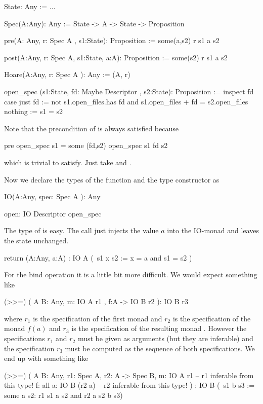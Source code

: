 \begin{alba}
  State: Any := ...

  Spec(A:Any): Any :=  State -> A -> State -> Proposition

  pre(A: Any, r: Spec A , s1:State): Proposition :=
    some(a,s2) r s1 a s2

  post(A:Any, r: Spec A, s1:State, a:A): Proposition :=
    some(s2) r s1 a s2


  Hoare(A:Any, r: Spec A ): Any := (A, r)

  open_spec (s1:State, fd: Maybe Descriptor , s2:State): Proposition :=
    inspect fd case
      just fd  :=
        not s1.open_files.has fd
        and
        s1.open_files + fd = s2.open_files
      nothing :=
        s1 = s2
\end{alba}
Note that the precondition of  is always satisfied because
%
\begin{alba}
   pre open_spec s1  = some (fd,s2) open_spec s1 fd s2
\end{alba}
%
which is trivial to satisfy. Just take  and .

Now we declare the types of the function  and the type constructor
 as
%
\begin{alba}
  IO(A:Any, spec: Spec A ): Any

  open: IO Descriptor open_spec
\end{alba}
%
The type of  is easy. The call  just injects the
value $a$ into the IO-monad and leaves the state unchanged.
%
\begin{alba}
  return (A:Any, a:A)
         : IO  A
               (\ s1 x s2 :=
                   x  = a and
                   s1 = s2 )
\end{alba}
%
For the bind operation it is a little bit more difficult. We would expect
something like
%
\begin{alba}
  (>>=) ( A B: Any,
          m: IO A r1 ,
          f:A -> IO B r2
        ): IO B r3
\end{alba}
%
where $r_1$ is the specification of the first monad and $r_2$ is the
specification of the monad $f(a)$ and $r_3$ is the specification of the
resulting monad . However the specifications $r_1$ and $r_2$
must be given as arguments (but they are inferable) and the specification
$r_3$ must be computed as the sequence of both specifications. We end up with
something like

%
\begin{alba}
  (>>=) ( A B: Any, r1: Spec A, r2: A -> Spec B,
          m: IO A r1               -- r1 inferable from this type!
          f: all a: IO B (r2 a)    -- r2 inferable from this type!
        )
        : IO  B
              (\ s1 b s3 :=
                  some a s2:
                    r1 s1 a s2  and
                    r2 a s2 b s3)
\end{alba}
%


